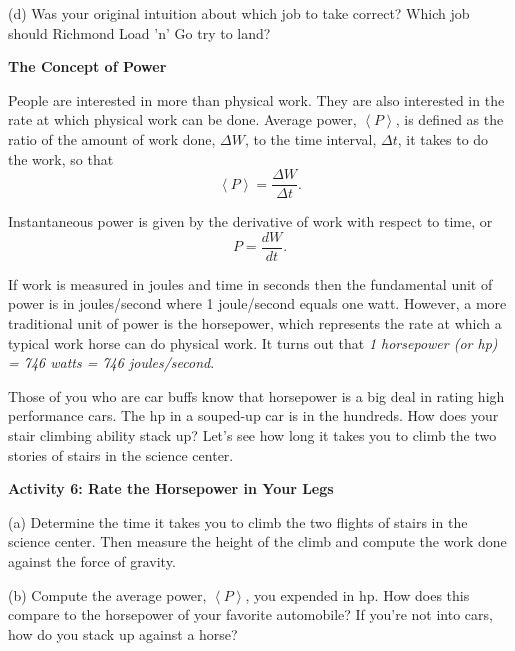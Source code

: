 (d) Was your original intuition about which job to take correct? Which job 
should Richmond Load 'n' Go try to land?
\vspace{20mm}

\textbf{The Concept of Power} 

People are interested in more than physical work. They are also interested in
the rate at which physical work can be done. Average power, \( \left\langle P\right\rangle  \),
is defined as the ratio of the amount of work done, \( \Delta  W\), to the
time interval, \( \Delta  t\), it takes to do the work, so that
\[
\left\langle P\right\rangle =\frac{\Delta W}{\Delta t}.\]


Instantaneous power is given by the derivative of work with respect to time,
or
\[
P=\frac{dW}{dt}.\]


If work is measured in joules and time in seconds then the fundamental unit
of power is in joules/second where 1 joule/second equals one watt. However,
a more traditional unit of power is the horsepower, which represents the rate
at which a typical work horse can do physical work. It turns out that \textit{1
horsepower (or hp) = 746 watts = 746 joules/second}.

Those of you who are car buffs know that horsepower is a big deal in rating
high performance cars. The hp in a souped-up car is in the hundreds. How does
your stair climbing ability stack up? Let's see how long it takes you to climb
the two stories of stairs in the science center.

\textbf{Activity 6: Rate the Horsepower in Your Legs} 

(a) Determine the time it takes you to climb the two flights of stairs in
the science center. Then measure the height of the climb and compute the work
done against the force of gravity.
\vspace{25mm}

(b) Compute the average power, \( \left\langle P\right\rangle  \), you expended
in hp. How does this compare to the horsepower of your favorite automobile?
If you're not into cars, how do you stack up against a horse?

